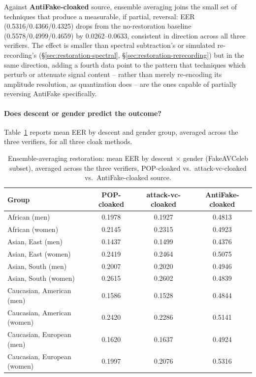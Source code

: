 \documentclass[11pt]{article}
\begin{document}
Against \textbf{AntiFake-cloaked} source, ensemble averaging joins the
small set of techniques that produce a measurable, if partial,
reversal: EER (0.5316/0.4366/0.4325) drops from the no-restoration
baseline (0.5578/0.4999/0.4659) by 0.0262--0.0633, consistent in
direction across all three verifiers. The effect is smaller than
spectral subtraction's or simulated re-recording's
(\S\ref{sec:restoration-spectral}, \S\ref{sec:restoration-rerecording})
but in the same direction, adding a fourth data point to the pattern
that techniques which perturb or attenuate signal content -- rather
than merely re-encoding its amplitude resolution, as quantization does
-- are the ones capable of partially reversing AntiFake specifically.

\paragraph{Does descent or gender predict the outcome?}
Table~\ref{tab:restoration-ensemble-demographics} reports mean EER by
descent and gender group, averaged across the three verifiers, for all
three cloak methods.

\begin{table}[H]
\centering
\caption{Ensemble-averaging restoration: mean EER by descent $\times$
gender (FakeAVCeleb subset), averaged across the three verifiers,
POP-cloaked vs.\ attack-vc-cloaked vs.\ AntiFake-cloaked source.}
\label{tab:restoration-ensemble-demographics}
\begin{tabular}{lccc}
\toprule
Group & POP-cloaked & attack-vc-cloaked & AntiFake-cloaked \\
\midrule
African (men)               & 0.1978 & 0.1927 & 0.4813 \\
African (women)              & 0.2145 & 0.2315 & 0.4923 \\
Asian, East (men)            & 0.1437 & 0.1499 & 0.4376 \\
Asian, East (women)          & 0.2419 & 0.2464 & 0.5075 \\
Asian, South (men)           & 0.2007 & 0.2020 & 0.4946 \\
Asian, South (women)         & 0.2615 & 0.2602 & 0.4839 \\
Caucasian, American (men)    & 0.1586 & 0.1528 & 0.4844 \\
Caucasian, American (women)  & 0.2420 & 0.2286 & 0.5141 \\
Caucasian, European (men)    & 0.1620 & 0.1637 & 0.4924 \\
Caucasian, European (women)  & 0.1997 & 0.2076 & 0.5316 \\
\bottomrule
\end{tabular}
\end{table}
\end{document}
